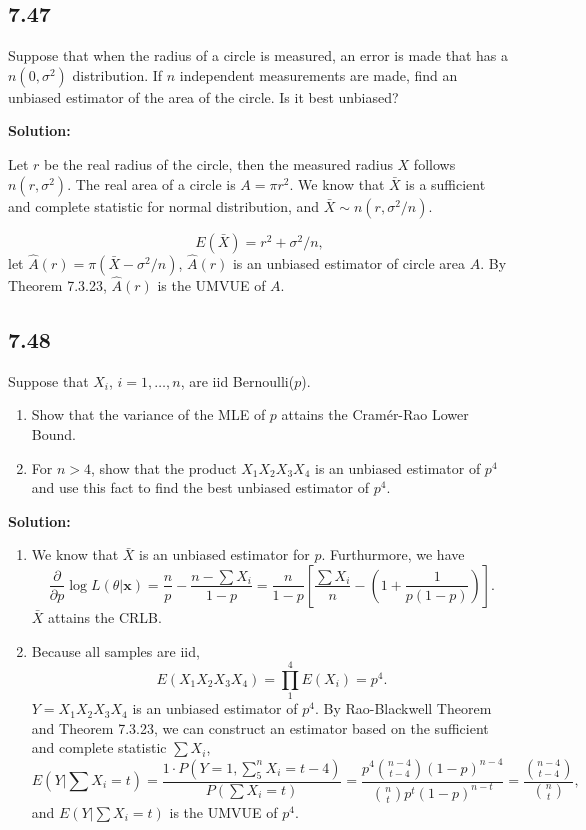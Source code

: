 \documentclass[11pt]{article}
\newcommand{\x}{\mathbf{x}}
\newcommand{\Sol}{\par {\bf Solution:}}
\newcommand{\Partial}[1]{\frac{\partial}{\partial #1}}
\begin{document}
\subsection*{7.47}
Suppose that when the radius of a circle is measured, an error is made that has a $n(0, \sigma^2)$ distribution. If $n$ independent measurements are made, find an unbiased estimator of the area of the circle. Is it best unbiased?
\Sol

Let $r$ be the real radius of the circle, then the measured radius $X$ follows $n(r, \sigma^2)$. The real area of a circle is $A = \pi r^2$.
We know that $\bar X$ is a sufficient and  complete statistic for normal distribution, and $\bar X \sim n(r, \sigma^2/n)$.

\[
E(\bar X) = r^2 + \sigma^2/n,
\]
let $\hat A(r) = \pi(\bar X - \sigma^2/n)$, $\hat A(r)$ is an unbiased estimator of circle area $A$. By Theorem 7.3.23, $\hat A(r)$ is the UMVUE of $A$.

\subsection*{7.48}
Suppose that $X_i$, $i = 1, \dots, n$, are iid Bernoulli($p$).
\begin{enumerate}[label=(\alph*)]
    \item Show that the variance of the MLE of $p$ attains the Cram\'{e}r-Rao Lower Bound.
    \item For $n > 4$, show that the product $X_1X_2X_3X_4$ is an unbiased estimator of $p^4$ and use this fact to find the best unbiased estimator of $p^4$.
\end{enumerate}

\Sol
\begin{enumerate}[label=(\alph*)]
    \item
    We know that $\bar X$ is an unbiased estimator for $p$. Furthurmore, we have
    \[
    \Partial p \log L(\theta|\x) = \frac{n}{p}-\frac{n-\sum X_i}{1-p} = \frac{n}{1-p}[\frac{\sum X_i}{n} - (1 + \frac{1}{p(1-p)})].
    \]
    $\bar X$ attains the CRLB.
    \item
    Because all samples are iid,
    \[
    E(X_1X_2X_3X_4) = \prod_1^4E(X_i) = p^4.
    \]
    $Y = X_1X_2X_3X_4$ is an unbiased estimator of $p^4$.
    By Rao-Blackwell Theorem and Theorem 7.3.23, we can construct an estimator based on the sufficient and complete statistic $\sum X_i$,
    \[
    E(Y|\sum X_i = t) = \frac{1 \cdot P(Y = 1, \sum_5^n X_i = t -4)}{P(\sum X_i = t)} = \frac{p^4{n-4 \choose t-4}(1-p)^{n-4}}{{n \choose t} p^t(1-p)^{n-t}} = \frac{{n-4 \choose  t-4}}{{n \choose t}},
    \]
    and $E(Y|\sum X_i = t)$ is the UMVUE of $p^4$.
\end{enumerate}
\end{document}
